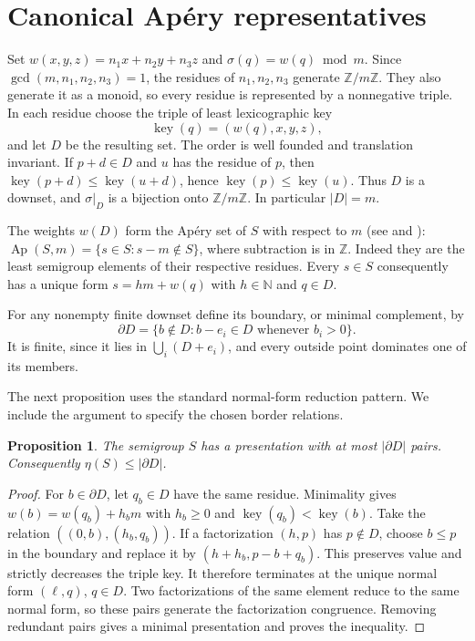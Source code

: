 \documentclass[11pt]{article}
\newtheorem{proposition}[theorem]{Proposition}
\theoremstyle{definition}
\theoremstyle{remark}
\theoremstyle{plain}
\DeclareMathOperator{\Ap}{Ap}
\begin{document}
\section{Canonical Ap\'ery representatives}
\label{sec:canonical}
Set $w(x,y,z)=n_1x+n_2y+n_3z$ and
$\sigma(q)=w(q)\bmod m$. Since $\gcd(m,n_1,n_2,n_3)=1$, the residues
of $n_1,n_2,n_3$ generate $\mathbb Z/m\mathbb Z$. They also generate it
as a monoid, so every residue is represented by a nonnegative triple.
In each residue choose the triple of least lexicographic key
\[
\operatorname{key}(q)=(w(q),x,y,z),
\]
and let $D$ be the resulting set. The order is well founded and
translation invariant. If $p+d\in D$ and $u$ has the residue of $p$,
then $\operatorname{key}(p+d)\le \operatorname{key}(u+d)$, hence $\operatorname{key}(p)\le \operatorname{key}(u)$. Thus $D$ is a
downset, and $\sigma|_D$ is a bijection onto $\mathbb Z/m\mathbb Z$.
In particular $|D|=m$.

The weights $w(D)$ form the Ap\'ery set of $S$ with respect to $m$
(see \cite{Apery46} and \cite[Chapter~2]{RG09}):
$\Ap(S,m)=\{s\in S:s-m\notin S\}$, where subtraction is in
$\mathbb Z$. Indeed they are the least semigroup elements of their
respective residues. Every $s\in S$ consequently has a unique form
$s=hm+w(q)$ with $h\in\mathbb N$ and $q\in D$.

For any nonempty finite downset define its boundary, or minimal complement, by
\[
\partial D=\{b\notin D:b-e_i\in D\text{ whenever }b_i>0\}.
\]
It is finite, since it lies in $\bigcup_i(D+e_i)$, and every outside
point dominates one of its members.

The next proposition uses the standard normal-form reduction pattern.
We include the argument to specify the chosen border relations.

\begin{proposition}\label{prop:border}
The semigroup $S$ has a presentation with at most $|\partial D|$ pairs.
Consequently $\eta(S)\le|\partial D|$.
\end{proposition}
\begin{proof}
For $b\in\partial D$, let $q_b\in D$ have the same residue.
Minimality gives
$w(b)=w(q_b)+h_bm$ with $h_b\ge0$ and $\operatorname{key}(q_b)<\operatorname{key}(b)$.
Take the relation $((0,b),(h_b,q_b))$.
If a factorization $(h,p)$ has $p\notin D$, choose $b\le p$ in the
boundary and replace it by $(h+h_b,p-b+q_b)$. This preserves value
and strictly decreases the triple key. It therefore terminates at the
unique normal form $(\ell,q)$, $q\in D$. Two factorizations of the same
element reduce to the same normal form, so these pairs generate the
factorization congruence. Removing redundant pairs gives a minimal
presentation and proves the inequality.
\end{proof}
\end{document}
